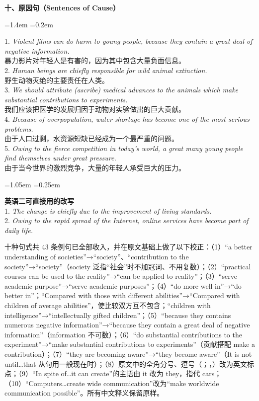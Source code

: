 \documentclass[11pt,a4paper]{ctexart}
\newcommand{\en}[1]{\textit{#1}}
\newcommand{\impr}[1]{\par\addvspace{3pt}\noindent{\bfseries【本次改进】}#1\par\addvspace{3pt}}
\newenvironment{note}{%
  \par\addvspace{5pt}%
  \begin{list}{}{\leftmargin=1.05em \rightmargin=0.25em \listparindent=0pt
    \itemindent=0pt \topsep=0pt \parsep=2pt \itemsep=2pt \partopsep=0pt}%
  \item\relax\small\color{ink}%
}{%
  \end{list}\addvspace{5pt}%
}
\newenvironment{eg}{%
  \par\addvspace{4pt}%
  \begin{list}{}{\leftmargin=1.4em \rightmargin=0.2em \listparindent=0pt
    \itemindent=0pt \topsep=0pt \parsep=2pt \itemsep=2pt \partopsep=0pt}%
  \item\relax
}{%
  \end{list}\addvspace{5pt}%
}
\begin{document}
\par\addvspace{6pt}\noindent\textbf{十、原因句（Sentences of Cause）}\par\addvspace{2pt}
\begin{eg}
1. \en{Violent films can do harm to young people, because they contain a great deal of negative information.}\\
暴力影片对年轻人是有害的，因为其中包含大量负面信息。\\
2. \en{Human beings are chiefly responsible for wild animal extinction.}\\
野生动物灭绝的主要责任在人类。\\
3. \en{We should attribute (ascribe) medical advances to the animals which make substantial contributions to experiments.}\\
我们应该把医学的发展归因于动物对实验做出的巨大贡献。\\
4. \en{Because of overpopulation, water shortage has become one of the most serious problems.}\\
由于人口过剩，水资源短缺已经成为一个最严重的问题。\\
5. \en{Owing to the fierce competition in today's world, a great many young people find themselves under great pressure.}\\
由于当今世界的激烈竞争，大量的年轻人承受巨大的压力。\\
\end{eg}
\begin{note}
\textbf{英语二可直接用的改写}\\
1. \en{The change is chiefly due to the improvement of living standards.}\\
2. \en{Owing to the rapid spread of the Internet, online services have become part of daily life.}
\end{note}

\impr{十种句式共 43 条例句已全部收入，并在原文基础上做了以下校正：（1）“a better understanding of societies”→“society”、“contribution to the society”→“society”（society 泛指“社会”时不加冠词、不用复数）；（2）“practical courses can be used to the reality”→“can be applied to reality”；（3）“serve academic purpose”→“serve academic purposes”；（4）“do more well in”→“do better in”；“Compared with those with different abilities”→“Compared with children of average abilities”，使比较双方互不包含；“children with intelligence”→“intellectually gifted children”；（5）“because they contains numerous negative information”→“because they contain a great deal of negative information”（information 不可数）；（6）“do substantial contributions to the experiment”→“make substantial contributions to experiments”（贡献搭配 make a contribution）；（7）“they are becoming aware”→“they become aware”（It is not until\ldots that 从句用一般现在时）；（8）原文中的全角分号、逗号（；，）改为英文标点；（9）“In spite of\ldots it can create”的主语由 it 改为 they，指代 cars；（10）“Computers\ldots create wide communication”改为“make worldwide communication possible”。所有中文释义保留原样。}
\end{document}
